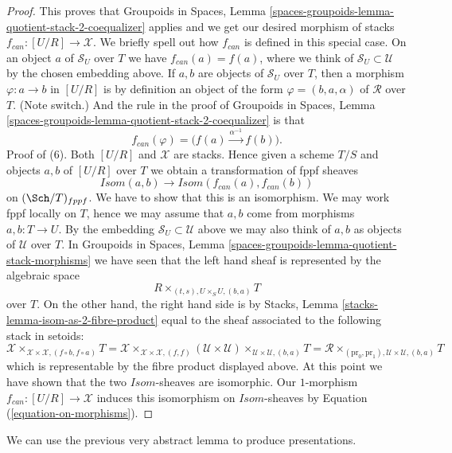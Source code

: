 \begin{proof}
\medskip\noindent
This proves that
Groupoids in Spaces,
Lemma \ref{spaces-groupoids-lemma-quotient-stack-2-coequalizer}
applies and we get our desired morphism of stacks
$f_{can} : [U/R] \to \mathcal{X}$. We briefly spell out how
$f_{can}$ is defined in this special case.
On an object $a$ of $\mathcal{S}_U$ over $T$
we have $f_{can}(a) = f(a)$, where we think of
$\mathcal{S}_U \subset \mathcal{U}$ by the chosen embedding above.
If $a, b$ are objects of $\mathcal{S}_U$ over $T$, then a morphism
$\varphi : a \to b$ in $[U/R]$ is by definition an object of the
form $\varphi = (b, a, \alpha)$ of $\mathcal{R}$ over $T$. (Note
switch.) And the rule in the proof of
Groupoids in Spaces,
Lemma \ref{spaces-groupoids-lemma-quotient-stack-2-coequalizer}
is that
\begin{equation}
\label{equation-on-morphisms}
f_{can}(\varphi) = \Big(f(a) \xrightarrow{\alpha^{-1}} f(b)\Big).
\end{equation}
Proof of (6). Both $[U/R]$ and $\mathcal{X}$ are stacks.
Hence given a scheme $T/S$ and objects $a, b$ of $[U/R]$
over $T$ we obtain a transformation of fppf sheaves
$$
\mathit{Isom}(a, b) \longrightarrow \mathit{Isom}(f_{can}(a), f_{can}(b))
$$
on $(\Sch/T)_{fppf}$. We have to show that this is an
isomorphism. We may work fppf locally on $T$, hence we may assume that
$a, b$ come from morphisms $a, b : T \to U$. By the embedding
$\mathcal{S}_U \subset \mathcal{U}$ above we may also think of $a, b$ as
objects of $\mathcal{U}$ over $T$. In
Groupoids in Spaces,
Lemma \ref{spaces-groupoids-lemma-quotient-stack-morphisms}
we have seen that the left hand sheaf is represented by the algebraic space
$$
R \times_{(t, s), U \times_S U, (b, a)} T
$$
over $T$. On the other hand, the right hand side is by
Stacks, Lemma \ref{stacks-lemma-isom-as-2-fibre-product}
equal to the sheaf associated to the following stack in setoids:
$$
\mathcal{X}
\times_{\mathcal{X} \times \mathcal{X}, (f \circ b, f \circ a)} T =
\mathcal{X}
\times_{\mathcal{X} \times \mathcal{X}, (f, f)}
(\mathcal{U} \times \mathcal{U})
\times_{\mathcal{U} \times \mathcal{U}, (b, a)} T =
\mathcal{R}
\times_{(\text{pr}_0, \text{pr}_1), \mathcal{U} \times \mathcal{U}, (b, a)} T
$$
which is representable by the fibre product displayed above.
At this point we have shown that the two $\mathit{Isom}$-sheaves
are isomorphic. Our $1$-morphism $f_{can} : [U/R] \to \mathcal{X}$ induces
this isomorphism on $\mathit{Isom}$-sheaves by
Equation (\ref{equation-on-morphisms}).
\end{proof}

\noindent
We can use the previous very abstract lemma to produce
presentations.


